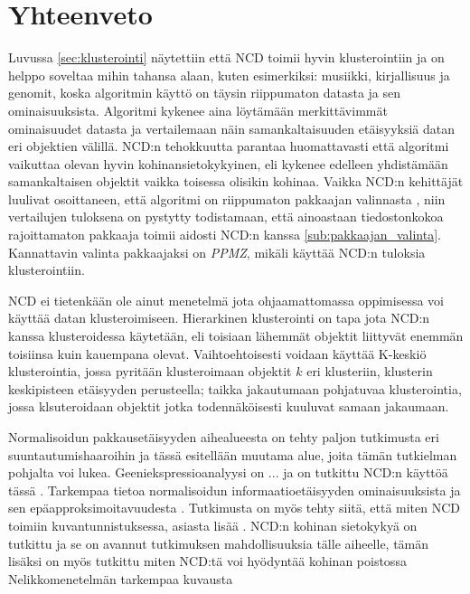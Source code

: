 \documentclass[12pt,finnish]{tktltiki2}
\theoremstyle{definition}
\theoremstyle{remark}
\begin{document}



\section{Yhteenveto} %
\label{sec:yhteenveto}

  Luvussa \ref{sec:klusterointi} näytettiin että NCD toimii hyvin klusterointiin ja on helppo soveltaa mihin tahansa alaan, kuten esimerkiksi: musiikki, kirjallisuus ja genomit, koska algoritmin käyttö on täysin riippumaton datasta ja sen ominaisuuksista. Algoritmi kykenee aina löytämään merkittävimmät ominaisuudet datasta ja vertailemaan näin samankaltaisuuden etäisyyksiä datan eri objektien välillä.
  NCD:n tehokkuutta parantaa huomattavasti että algoritmi vaikuttaa olevan hyvin kohinansietokykyinen, eli kykenee edelleen yhdistämään samankaltaisen objektit vaikka toisessa olisikin kohinaa.
  Vaikka NCD:n kehittäjät luulivat osoittaneen, että algoritmi on riippumaton pakkaajan valinnasta \cite{CV05}, niin vertailujen tuloksena on pystytty todistamaan, että ainoastaan tiedostonkokoa rajoittamaton pakkaaja toimii aidosti NCD:n kanssa \ref{sub:pakkaajan_valinta}.
  Kannattavin valinta pakkaajaksi on \emph{PPMZ}, mikäli käyttää NCD:n tuloksia klusterointiin.

  NCD ei tietenkään ole ainut menetelmä jota ohjaamattomassa oppimisessa voi käyttää datan klusteroimiseen.
  Hierarkinen klusterointi on tapa jota NCD:n kanssa klusteroidessa käytetään, eli toisiaan lähemmät objektit liittyvät enemmän toisiinsa kuin kauempana olevat. Vaihtoehtoisesti voidaan käyttää K-keskiö klusterointia, jossa pyritään klusteroimaan objektit $k$ eri klusteriin, klusterin keskipisteen etäisyyden perusteella; taikka jakautumaan pohjatuvaa klusterointia, jossa klsuteroidaan objektit jotka todennäköisesti kuuluvat samaan jakaumaan.

  Normalisoidun pakkausetäisyyden aihealueesta on tehty paljon tutkimusta eri suuntautumishaaroihin ja tässä esitellään muutama alue, joita tämän tutkielman pohjalta voi lukea.
  Geeniekspressioanalyysi on ... ja on tutkittu NCD:n käyttöä tässä \cite{nykter2005normalized}.
  Tarkempaa tietoa normalisoidun informaatioetäisyyden ominaisuuksista ja sen epäapproksimoitavuudesta \cite{terwijn2011nonapproximability}.
  Tutkimusta on myös tehty siitä, että miten NCD toimiin kuvantunnistuksessa, asiasta lisää \cite{doi:10.1117/12.704334}.
  NCD:n kohinan sietokykyä on tutkittu ja se on avannut tutkimuksen mahdollisuuksia tälle aiheelle, tämän lisäksi on myös tutkittu miten NCD:tä voi hyödyntää kohinan poistossa \cite{vitanyi2013similarity}
  Nelikkomenetelmän tarkempaa kuvausta \cite{DBLP:journals/corr/abs-cs-0606048}
\end{document}
